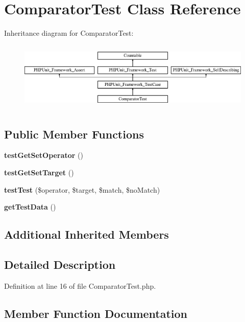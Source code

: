 \section{Comparator\+Test Class Reference}
\label{class_symfony_1_1_component_1_1_finder_1_1_tests_1_1_comparator_1_1_comparator_test}
Inheritance diagram for Comparator\+Test\+:\begin{figure}[H]
\begin{center}
\leavevmode
\includegraphics[height=3.303835cm]{class_symfony_1_1_component_1_1_finder_1_1_tests_1_1_comparator_1_1_comparator_test}
\end{center}
\end{figure}
\subsection*{Public Member Functions}
\begin{DoxyCompactItemize}
\item 
{\bf test\+Get\+Set\+Operator} ()
\item 
{\bf test\+Get\+Set\+Target} ()
\item 
{\bf test\+Test} (\$operator, \$target, \$match, \$no\+Match)
\item 
{\bf get\+Test\+Data} ()
\end{DoxyCompactItemize}
\subsection*{Additional Inherited Members}


\subsection{Detailed Description}


Definition at line 16 of file Comparator\+Test.\+php.



\subsection{Member Function Documentation}

